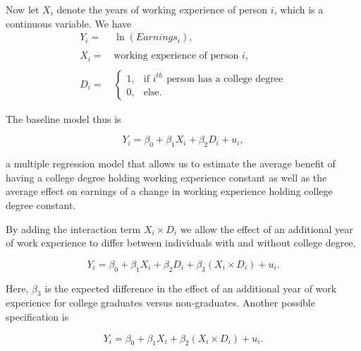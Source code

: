 \documentclass[
]{article}
\begin{document}
Now let \(X_i\) denote the years of working experience of person \(i\),
which is a continuous variable. We have \begin{align*}
  Y_i =& \, \ln(Earnings_i), \\
  \\
  X_i =& \, \text{working experience of person }i, \\
  \\
  D_i =& \,  
    \begin{cases}
      1, & \text{if $i^{th}$ person has a college degree} \\
      0, & \text{else}.
    \end{cases}
\end{align*}

The baseline model thus is

\[ Y_i = \beta_0 + \beta_1 X_i + \beta_2 D_i + u_i, \]

a multiple regression model that allows us to estimate the average
benefit of having a college degree holding working experience constant
as well as the average effect on earnings of a change in working
experience holding college degree constant.

By adding the interaction term \(X_i \times D_i\) we allow the effect of
an additional year of work experience to differ between individuals with
and without college degree,

\[ Y_i = \beta_0 + \beta_1 X_i + \beta_2 D_i + \beta_3  (X_i \times D_i) + u_i. \]

Here, \(\beta_3\) is the expected difference in the effect of an
additional year of work experience for college graduates versus
non-graduates. Another possible specification is

\[ Y_i = \beta_0 + \beta_1 X_i + \beta_2 (X_i \times D_i) + u_i. \]
\end{document}
